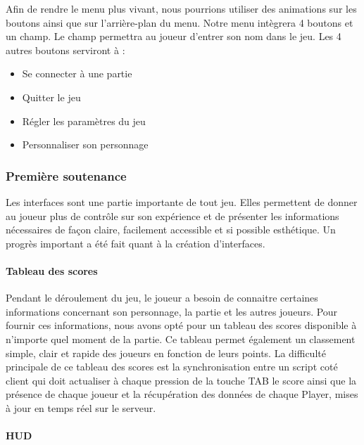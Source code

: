         Afin de rendre le menu plus vivant, 
        nous pourrions utiliser des animations sur les boutons ainsi que sur l’arrière-plan du menu. 
        Notre menu intègrera 4 boutons et un champ. Le champ permettra au joueur d’entrer son nom dans le jeu.
        Les 4 autres boutons serviront à :
        \begin{itemize}
                \item Se connecter à une partie
                \item Quitter le jeu
                \item Régler les paramètres du jeu
                \item Personnaliser son personnage
        \end{itemize}


    \vspace{0.5cm}
    \subsubsection{Première soutenance}
    \vspace{0.5cm}

        Les interfaces sont une partie importante de tout jeu. Elles permettent de donner au joueur plus de contrôle sur son expérience 
        et de présenter les informations nécessaires de façon claire, facilement accessible et si possible esthétique. Un progrès 
        important a été fait quant à la création d'interfaces.
        
        \paragraph{Tableau des scores}

            Pendant le déroulement du jeu, le joueur a besoin de connaitre certaines informations concernant son personnage, la partie et les autres joueurs. 
            Pour fournir ces informations, nous avons opté pour un tableau des scores disponible à n’importe quel moment de la partie. Ce tableau permet également un classement simple, clair et rapide des joueurs en fonction de leurs points.
            La difficulté principale de ce tableau des scores est la synchronisation entre un script coté client qui doit actualiser à chaque pression de la touche TAB le score ainsi que la présence de chaque joueur et la récupération des données de chaque Player, mises à jour en temps réel sur le serveur.

        \paragraph{HUD}


